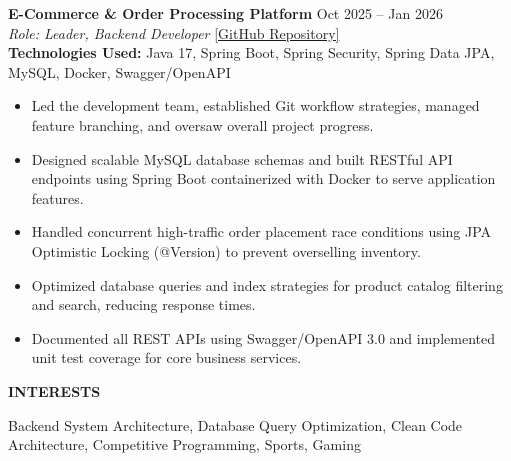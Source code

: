 ﻿\documentclass[11pt,a4paper]{article}
\newcommand{\cvsection}[1]{%
  \vspace{7pt}%
  \noindent\textbf{\large #1}\par%
  \vspace{3pt}%
}
\begin{document}
\noindent
\textbf{E-Commerce \& Order Processing Platform} \hfill Oct 2025 -- Jan 2026 \\
\textit{Role: Leader, Backend Developer} \hfill \href{https://github.com/ng-doanh/ecommerce-api}{[GitHub Repository]} \\
\textbf{Technologies Used:} Java 17, Spring Boot, Spring Security, Spring Data JPA, MySQL, Docker, Swagger/OpenAPI
\begin{itemize}[leftmargin=1.5em, itemsep=2pt, topsep=2pt]
    \item Led the development team, established Git workflow strategies, managed feature branching, and oversaw overall project progress.
    \item Designed scalable MySQL database schemas and built RESTful API endpoints using Spring Boot containerized with Docker to serve application features.
    \item Handled concurrent high-traffic order placement race conditions using JPA Optimistic Locking (@Version) to prevent overselling inventory.
    \item Optimized database queries and index strategies for product catalog filtering and search, reducing response times.
    \item Documented all REST APIs using Swagger/OpenAPI 3.0 and implemented unit test coverage for core business services.
\end{itemize}

\cvsection{INTERESTS}
Backend System Architecture, Database Query Optimization, Clean Code Architecture, Competitive Programming, Sports, Gaming
\end{document}
